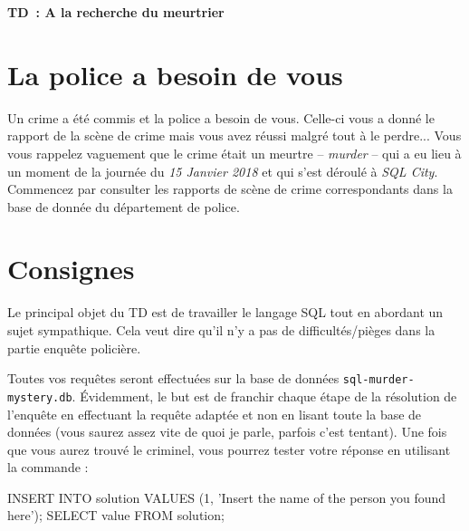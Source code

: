 \documentclass[10pt]{article}
\newcommand{\DocTitle}{A la recherche du meurtrier} %
\newcommand{\DocType}{TD} %
\newcommand{\DocNumber}{} %
\begin{document}
\begin{center}
\vspace{1cm}\textbf{\Large \DocType \ \DocNumber: \DocTitle}
\end{center}




\section{La police a besoin de vous}

Un crime a été commis et la police a besoin de vous. Celle-ci vous a donné le rapport de la scène 
de crime mais vous avez réussi malgré tout à le perdre... Vous vous rappelez vaguement que le crime
était un meurtre -- \emph{murder} -- qui a eu lieu à un moment de la journée du \emph{15 Janvier 2018} et qui s'est
déroulé à \emph{SQL City}. Commencez par consulter les rapports de scène de crime correspondants dans
la base de donnée du département de police.

\section{Consignes}

Le principal objet du TD est de travailler le langage SQL tout en abordant un sujet sympathique. Cela veut dire qu'il n'y a pas de difficultés/pièges dans la partie enquête policière. 

Toutes vos requêtes seront effectuées sur la base de données \texttt{sql-murder-mystery.db}. \'Evidemment, le but est
de franchir chaque étape de la résolution de l'enquête en effectuant la requête adaptée et non en lisant toute la
base de données (vous saurez assez vite de quoi je parle, parfois c'est tentant). Une fois que vous aurez trouvé le
criminel, vous pourrez tester votre réponse en utilisant la commande :

\begin{sql}
INSERT INTO solution VALUES (1, 'Insert the name of the person you found here');
SELECT value FROM solution;
\end{sql}
\end{document}
